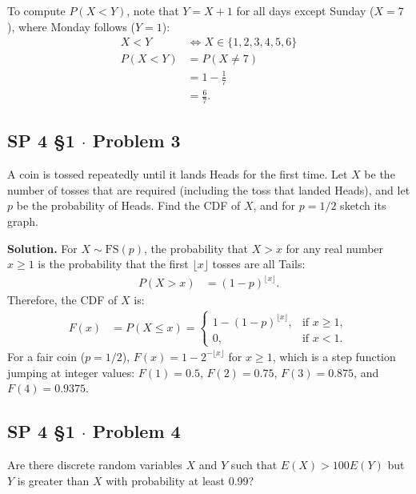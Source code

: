 \documentclass[11pt,a4paper]{article}
\begin{document}
To compute $P(X < Y)$, note that $Y = X + 1$ for all days except Sunday ($X = 7$), where Monday follows ($Y = 1$):
\begin{align*}
X < Y &\iff X \in \{1, 2, 3, 4, 5, 6\} \\
P(X < Y) &= P(X \neq 7) \\
&= 1 - \frac{1}{7} \\
&= \frac{6}{7}.
\end{align*}

\vspace{10pt}
\subsection{SP 4 \S1 $\cdot$ Problem 3}
\begin{tcolorbox}[title={SP 4 \S1 $\cdot$ Problem 3}]
A coin is tossed repeatedly until it lands Heads for the first time. Let $X$ be the number of tosses that are required (including the toss that landed Heads), and let $p$ be the probability of Heads. Find the CDF of $X$, and for $p = 1/2$ sketch its graph.
\end{tcolorbox}

\noindent \textbf{Solution.} For $X \sim \text{FS}(p)$, the probability that $X > x$ for any real number $x \ge 1$ is the probability that the first $\lfloor x \rfloor$ tosses are all Tails:
\begin{align*}
P(X > x) &= (1 - p)^{\lfloor x \rfloor}.
\end{align*}
Therefore, the CDF of $X$ is:
\begin{align*}
F(x) &= P(X \le x) = \begin{cases}
1 - (1 - p)^{\lfloor x \rfloor}, & \text{if } x \ge 1, \\[4pt]
0, & \text{if } x < 1.
\end{cases}
\end{align*}
For a fair coin ($p = 1/2$), $F(x) = 1 - 2^{-\lfloor x \rfloor}$ for $x \ge 1$, which is a step function jumping at integer values: $F(1) = 0.5$, $F(2) = 0.75$, $F(3) = 0.875$, and $F(4) = 0.9375$.

\vspace{10pt}
\subsection{SP 4 \S1 $\cdot$ Problem 4}
\begin{tcolorbox}[title={SP 4 \S1 $\cdot$ Problem 4}]
Are there discrete random variables $X$ and $Y$ such that $E(X) > 100E(Y)$ but $Y$ is greater than $X$ with probability at least 0.99?
\end{tcolorbox}
\end{document}
